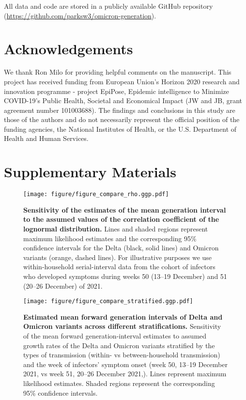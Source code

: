 \documentclass[12pt]{article}
\begin{document}
All data and code are stored in a publicly available GitHub repository (\url{https://github.com/parksw3/omicron-generation}).

\section*{Acknowledgements}

We thank Ron Milo for providing helpful comments on the manuscript. This project has received funding from European Union's Horizon 2020 research and innovation programme - project EpiPose, Epidemic intelligence to Minimize COVID-19’s Public Health, Societal and Economical Impact (JW and JB, grant agreement number 101003688). The findings and conclusions in this study are those of the authors and do not necessarily represent the official position of the funding agencies, the National Institutes of Health, or the U.S. Department of Health and Human Services.

\pagebreak

\section*{Supplementary Materials}
\setcounter{figure}{0}
\renewcommand{\thefigure}{S\arabic{figure}}

\begin{figure}[!th]
\texttt{[image: figure/figure\_compare\_rho.ggp.pdf]}
\caption{
\textbf{Sensitivity of the estimates of the mean generation interval to the assumed values of the correlation coefficient of the lognormal distribution.}
Lines and shaded regions represent maximum likelihood estimates and the corresponding 95\% confidence intervals for the Delta (black, solid lines) and Omicron variants (orange, dashed lines).
For illustrative purposes we use within-household serial-interval data from the cohort of infectors who developed symptoms during weeks 50 (13--19 December) and 51 (20--26 December) of 2021.
}
\end{figure}

\pagebreak

\begin{figure}[!th]
\texttt{[image: figure/figure\_compare\_stratified.ggp.pdf]}
\caption{
\textbf{Estimated mean forward generation intervals of Delta and Omicron variants across different stratifications.}
Sensitivity of the mean forward generation-interval estimates to assumed growth rates of the Delta and Omicron variants stratified by the types of transmission (within- vs between-household transmission) and the week of infectors' symptom onset (week 50, 13--19 December 2021, vs week 51, 20--26 December 2021,).
Lines represent maximum likelihood estimates.
Shaded regions represent the corresponding 95\% confidence intervals.
}
\end{figure}
\end{document}
